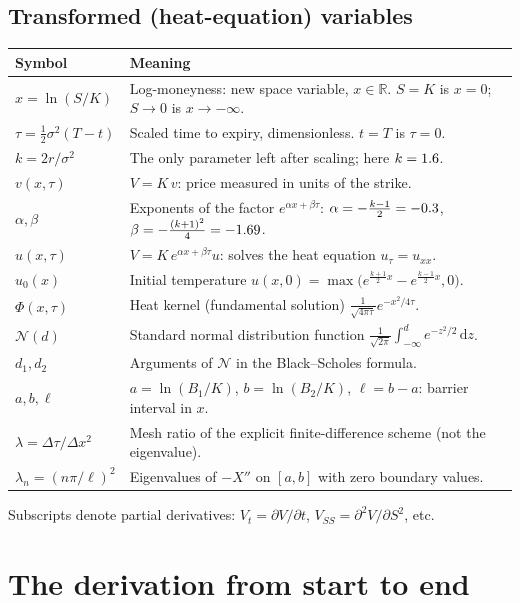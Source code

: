 \documentclass[11pt]{article}
\newcommand{\N}{\mathcal N}
\newcommand{\dd}{\,\mathrm d}
\newcommand{\R}{\mathbb R}
\theoremstyle{definition}
\begin{document}
\subsection*{Transformed (heat-equation) variables}
\begin{center}
\renewcommand{\arraystretch}{1.25}
\begin{tabular}{@{}lp{}@{}}
\toprule
Symbol & Meaning \\
\midrule
$x=\ln(S/K)$ & Log-moneyness: new space variable, $x\in\R$. $S=K$ is $x=0$; $S\to0$ is $x\to-\infty$. \\
$\tau=\tfrac12\sigma^2(T-t)$ & Scaled time to expiry, dimensionless. $t=T$ is $\tau=0$. \\
$k=2r/\sigma^2$ & The only parameter left after scaling; here $k=\num{1.6}$. \\
$v(x,\tau)$ & $V=K\,v$: price measured in units of the strike. \\
$\alpha,\beta$ & Exponents of the factor $e^{\alpha x+\beta\tau}$: $\alpha=-\frac{k-1}{2}=\num{-0.3}$, $\beta=-\frac{(k+1)^2}{4}=\num{-1.69}$. \\
$u(x,\tau)$ & $V=K\,e^{\alpha x+\beta\tau}u$: solves the heat equation $u_\tau=u_{xx}$. \\
$u_0(x)$ & Initial temperature $u(x,0)=\max\big(e^{\frac{k+1}2x}-e^{\frac{k-1}2x},0\big)$. \\
$\Phi(x,\tau)$ & Heat kernel (fundamental solution) $\frac{1}{\sqrt{4\pi\tau}}e^{-x^2/4\tau}$. \\
$\N(d)$ & Standard normal distribution function $\frac{1}{\sqrt{2\pi}}\int_{-\infty}^d e^{-z^2/2}\dd z$. \\
$d_1,d_2$ & Arguments of $\N$ in the Black--Scholes formula. \\
$a,b,\ell$ & $a=\ln(B_1/K)$, $b=\ln(B_2/K)$, $\ell=b-a$: barrier interval in $x$. \\
$\lambda=\Delta\tau/\Delta x^2$ & Mesh ratio of the explicit finite-difference scheme (not the eigenvalue). \\
$\lambda_n=(n\pi/\ell)^2$ & Eigenvalues of $-X''$ on $[a,b]$ with zero boundary values. \\
\bottomrule
\end{tabular}
\end{center}

\noindent Subscripts denote partial derivatives: $V_t=\partial V/\partial t$, $V_{SS}=\partial^2V/\partial S^2$, etc.

\section{The derivation from start to end}
\end{document}
